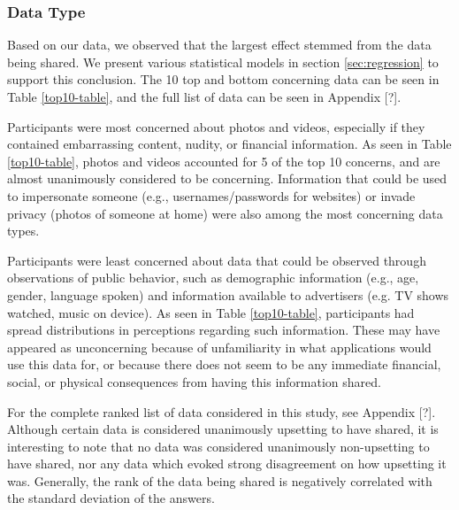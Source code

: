 
\subsubsection{Data Type}
\label{sec:datatypes}

Based on our data, we observed that the largest effect stemmed from the data being shared. We present various statistical models in section \ref{sec:regression} to support this conclusion. The 10 top and bottom concerning data can be seen in Table \ref{top10-table}, and the full list of data can be seen in Appendix [?]. 

Participants were most concerned about photos and videos, especially if they contained embarrassing content, nudity, or financial information. As seen in Table \ref{top10-table}, photos and videos accounted for 5 of the top 10 concerns, and are almost unanimously considered to be concerning. Information that could be used to impersonate someone (e.g., usernames/passwords for websites) or invade privacy (photos of someone at home) were also among the most concerning data types. 

Participants were least concerned about data that could be observed through observations of public behavior, such as demographic information (e.g., age, gender, language spoken) and information available to advertisers (e.g. TV shows watched, music on device). As seen in Table \ref{top10-table}, participants had spread distributions in perceptions regarding such information.  These may have appeared as unconcerning because of unfamiliarity in what applications would use this data for, or because there does not seem to be any immediate financial, social, or physical consequences from having this information shared.

For the complete ranked list of data considered in this study, see Appendix [?]. Although certain data is considered unanimously upsetting to have shared, it is interesting to note that no data was considered unanimously non-upsetting to have shared, nor any data which evoked strong disagreement on how upsetting it was. Generally,  the rank of the data being shared is negatively correlated with the standard deviation of the answers.

